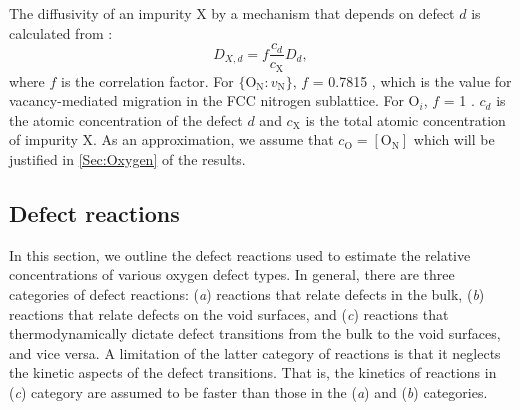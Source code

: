 \documentclass[preprint,12pt,sort&compress]{elsarticle}
\newcommand{\?}{\stackrel{?}{=}}
\begin{document}




The diffusivity of an impurity X by a mechanism that depends on defect $d$ is calculated from \cite{Cooper2023}:
\begin{equation}
D_{X, d} = f \frac{c_d}{c_\text{X}} D_d,
\end{equation}
where $f$ is the correlation factor. For $\{\text{O}_\text{N} \! : \! v_\text{N}\}$, $f$ = 0.7815 \cite{Laughlin2014}, which is the value for vacancy-mediated migration in the FCC nitrogen sublattice. For O$_i$, $f$ = 1 \cite{Laughlin2014}. $c_d$ is the atomic concentration of the defect $d$ and $c_\text{X}$ is the total atomic concentration of impurity X. As an approximation, we assume that $c_\text{O} = [\text{O}_\text{N}]$ which will be justified in \cref{Sec:Oxygen} of the results.

\subsection{Defect reactions}

In this section, we outline the defect reactions used to estimate the relative concentrations of various oxygen defect types. In general, there are three categories of defect reactions: (\textit{a}) reactions that relate defects in the bulk, (\textit{b}) reactions that relate defects on the void surfaces, and (\textit{c}) reactions that thermodynamically dictate defect transitions from the bulk to the void surfaces, and vice versa. A limitation of the latter category of reactions is that it neglects the kinetic aspects of the defect transitions. That is, the kinetics of reactions in (\textit{c}) category are assumed to be faster than those in the (\textit{a}) and (\textit{b}) categories. %
\end{document}
